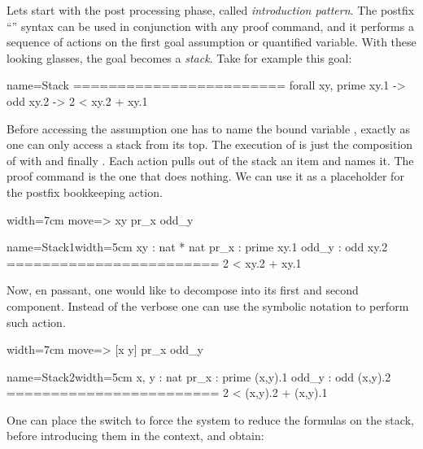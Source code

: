 \index[ssr]{\C{=>}}

Lets start with the post processing phase, called \emph{introduction pattern}.
The postfix ``'' syntax can be used in conjunction with any proof
command, and it performs a sequence of actions on the first goal assumption or
quantified variable.  With these looking glasses, the goal becomes a
\emph{stack}. Take for example this goal:

\begin{coqout}{name=Stack}{}
========================
forall xy, prime xy.1 -> odd xy.2 -> 2 < xy.2 + xy.1
\end{coqout}

Before accessing the assumption  one has to name the
bound variable , exactly as one can only access a stack from its top.
The execution of  is just the composition of
 with  and finally .  Each action
pulls out of the stack an item and names it.  The  proof
command is the one that does nothing.  We can use it as a placeholder
for the postfix \C{=>} bookkeeping action.

\begin{coq}{}{width=7cm}
move=> xy pr_x odd_y
\end{coq}
\begin{coqout}{name=Stack1}{width=5cm}
 xy : nat * nat
 pr_x : prime xy.1
 odd_y : odd xy.2
========================
 2 < xy.2 + xy.1
\end{coqout}

Now, en passant, one would like to decompose  into its first
and second component.  Instead of the verbose 
one can use the symbolic notation \C{[]} to perform such action.

\begin{coq}{}{width=7cm}
move=> [x y] pr_x odd_y
\end{coq}
\begin{coqout}{name=Stack2}{width=5cm}
 x, y : nat
 pr_x : prime (x,y).1
 odd_y : odd (x,y).2
========================
 2 < (x,y).2 + (x,y).1
\end{coqout}

One can place the \C{/=} switch to force the system to reduce the formulas on
the stack, before introducing them in the context, and obtain:


